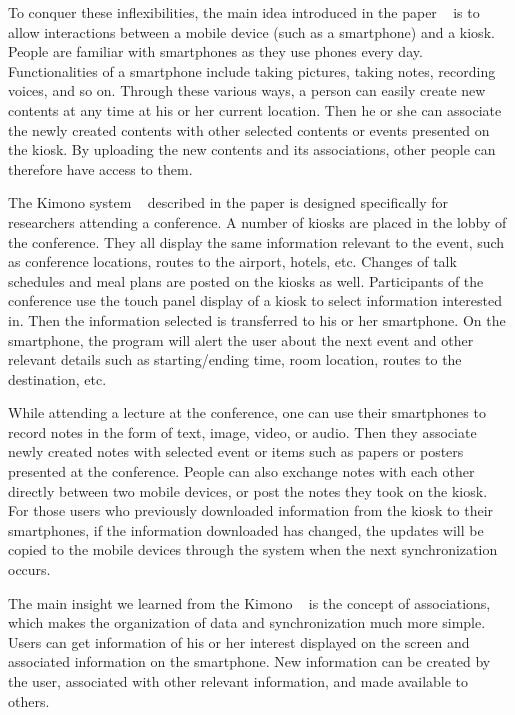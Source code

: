 \documentclass{sigchi}
\begin{document}
To conquer these inflexibilities, the main idea introduced in the paper ~\cite{huang2005kimono} is to allow interactions between a mobile device (such as a smartphone) and a kiosk. People are familiar with smartphones as they use phones every day. Functionalities of a smartphone include taking pictures, taking notes, recording voices, and so on. Through these various ways, a person can easily create new contents at any time at his or her current location. Then he or she can associate the newly created contents with other selected contents or events presented on the kiosk. By uploading the new contents and its associations, other people can therefore have access to them.


The Kimono system ~\cite{huang2005kimono} described in the paper is designed specifically for researchers attending a conference. A number of kiosks are placed in the lobby of the conference. They all display the same information relevant to the event, such as conference locations, routes to the airport, hotels, etc. Changes of talk schedules and meal plans are posted on the kiosks as well. Participants of the conference use the touch panel display of a kiosk to select information interested in. Then the information selected is transferred to his or her smartphone. On the smartphone, the program will alert the user about the next event and other relevant details such as starting/ending time, room location, routes to the destination, etc.


While attending a lecture at the conference, one can use their smartphones to record notes in the form of text, image, video, or audio. Then they associate newly created notes with selected event or items such as papers or posters presented at the conference. People can also exchange notes with each other directly between two mobile devices, or post the notes they took on the kiosk. For those users who previously downloaded information from the kiosk to their smartphones, if the information downloaded has changed, the updates will be copied to the mobile devices through the system when the next synchronization occurs. 


The main insight we learned from the Kimono ~\cite{huang2005kimono} is the concept of associations, which makes the organization of data and synchronization much more simple. Users can get information of his or her interest displayed on the screen and associated information on the smartphone. New information can be created by the user, associated with other relevant information, and made available to others.
\end{document}
